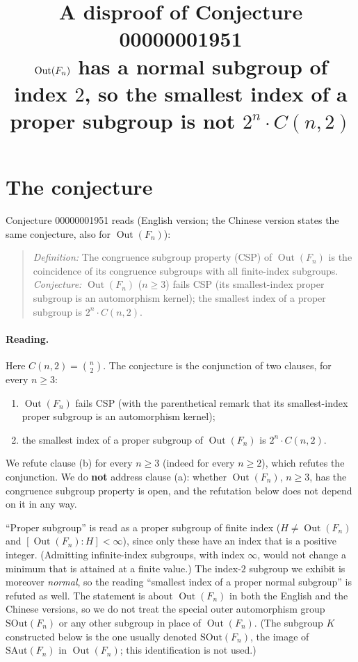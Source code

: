 \documentclass[11pt]{article}
\title{A disproof of Conjecture 00000001951\\[2pt]
\large $\Out(F_n)$ has a normal subgroup of index $2$, so the smallest index of a proper subgroup
is not $2^n\cdot C(n,2)$}
\date{}
\theoremstyle{definition}
\theoremstyle{remark}
\renewcommand{\_}{\oldus\allowbreak}
\newcommand{\Out}{\operatorname{Out}}
\begin{document}
\sloppy
\maketitle

\section{The conjecture}

Conjecture 00000001951 reads (English version; the Chinese version states the same conjecture, also for
$\Out(F_n)$):

\begin{quote}
\emph{Definition:} The congruence subgroup property (CSP) of $\Out(F_n)$ is the coincidence of its
congruence subgroups with all finite-index subgroups.
\emph{Conjecture:} $\Out(F_n)$ ($n\ge 3$) fails CSP (its smallest-index proper subgroup is an automorphism
kernel); the smallest index of a proper subgroup is $2^n\cdot C(n,2)$.
\end{quote}

\paragraph{Reading.} Here $C(n,2)=\binom{n}{2}$. The conjecture is the conjunction of two clauses, for
every $n\ge 3$:
\begin{enumerate}[label=(\alph*)]
  \item $\Out(F_n)$ fails CSP (with the parenthetical remark that its smallest-index proper subgroup is an
        automorphism kernel);
  \item the smallest index of a proper subgroup of $\Out(F_n)$ is $2^n\cdot C(n,2)$.
\end{enumerate}
We refute clause (b) for every $n\ge 3$ (indeed for every $n\ge 2$), which refutes the conjunction. We do
\textbf{not} address clause (a): whether $\Out(F_n)$, $n\ge 3$, has the congruence subgroup property is
open, and the refutation below does not depend on it in any way.

``Proper subgroup'' is read as a proper subgroup of finite index ($H\ne\Out(F_n)$ and
$[\Out(F_n):H]<\infty$), since only these have an index that is a positive integer. (Admitting
infinite-index subgroups, with index $\infty$, would not change a minimum that is attained at a finite
value.) The index-$2$ subgroup we exhibit is moreover \emph{normal}, so the reading ``smallest index of a
proper normal subgroup'' is refuted as well. The statement is about $\Out(F_n)$ in both the English and the
Chinese versions, so we do not treat the special outer automorphism group $\mathrm{SOut}(F_n)$ or any other
subgroup in place of $\Out(F_n)$. (The subgroup $K$ constructed below is the one usually denoted $\mathrm{SOut}(F_n)$, the image of
$\mathrm{SAut}(F_n)$ in $\Out(F_n)$; this identification is not used.)
\end{document}
